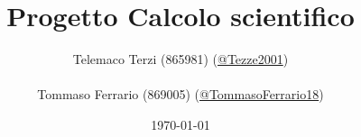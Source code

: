 \documentclass[a4paper, oneside]{report}
\title{Progetto Calcolo scientifico}
\author{
    Telemaco Terzi (865981) (\href{https://github.com/Tezze2001}{@Tezze2001}) \\\\
    Tommaso Ferrario (869005) (\href{https://github.com/TommasoFerrario18}{@TommasoFerrario18})
    }
\date{\today}
\begin{document}
\maketitle
\newtheorem{teorema}{Teorema}
\newtheorem{dimostrazione}{Dimostrazione}
\newtheorem{definizione}{Definizione}
\newtheorem{esempio}{Esempio}
\newtheorem{nota}{Nota}

\tableofcontents



\end{document}
